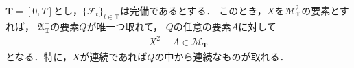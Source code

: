 	\begin{comment}
	\begin{screen}
		\begin{dfn}[ナチュラル]
			$(\Omega,\mathscr{F},P)$を確率空間とし，$\mathbf{T}$を$[0,\infty[$か$[0,T]$とし，
			$\{\mathscr{F}_t\}_{t \in \mathbf{T}}$を$\mathscr{F}$に付随するフィルトレーションとする．
			$A$が$(\Omega,\mathscr{F},P)$上の$\{\mathscr{F}_t\}_{t \in \mathbf{T}}$-増大過程であって，
			かつ$M$を任意に与えられた$(\Omega,\mathscr{F},P)$上の有界かつ$RCLL$な
			$\{\mathscr{F}_t\}_{t \in \mathbf{T}}$-マルチンゲールとするときに
			\begin{align}
				\forall t \in \mathbf{T}\, 
				\left[\, E(M_t A_t) = E \int_{(0,t]} M_{s-}\ dA_s\, \right]
			\end{align}
			を満たすならば，$A$は{\bf ナチュラル}\index{ナチュラル}{\bf (natural)}であるという．
		\end{dfn}
	\end{screen}
	\end{comment}
	
	\begin{screen}
		\begin{thm}[二乗可積分マルチンゲールは増大過程とマルチンゲールに分解できる]
		\label{thm:decomposition_of_local_martingales}
			$\mathbf{T} = [0,T]$とし，$\{\mathscr{F}_t\}_{t \in \mathbf{T}}$は完備であるとする．
			このとき，$X$を$\mathscr{M}^2_{\mathbf{T}}$の要素とすれば，
			$\mathfrak{A}^+_{\mathbf{T}}$の要素$Q$が唯一つ取れて，
			$Q$の任意の要素$A$に対して
			\begin{align}
				X^2 - A \in \mathscr{M}_{\mathbf{T}}
			\end{align}
			となる．特に，$X$が連続であれば$Q$の中から連続なものが取れる．
		\end{thm}
	\end{screen}
	
